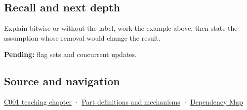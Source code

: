 \subsection{Recall and next depth}\label{appendix-a427ce8ce8a6-recall-and-next-depth}

Explain bitwise or without the label, work the example above, then state the assumption whose removal would change the result.

\textbf{Pending:} flag sets and concurrent updates.

\subsection{Source and navigation}\label{appendix-a427ce8ce8a6-source-and-navigation}

\hyperref[01-foundations-i-ch001-from-a-signal-to-an-interpretation]{C001 teaching chapter} · \hyperref[appendix-fd090d982a15]{Part definitions and mechanisms} · \hyperref[appendix-4ad47bdd269a]{Dependency Map}
